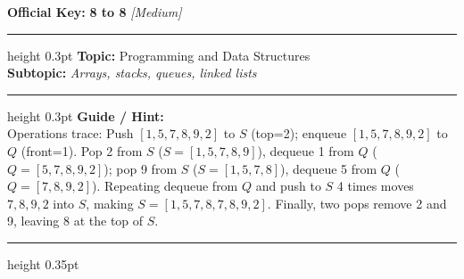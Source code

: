 \documentclass[a4paper,10pt]{article}
\begin{document}
\begin{tcolorbox}
\textbf{Official Key:} \textbf{\large 8 to 8} \hfill \textit{\small [Medium]}
\vspace{2pt}\hrule height 0.3pt\vspace{3pt}
\textbf{Topic:} Programming and Data Structures \\
\textbf{Subtopic:} \textit{Arrays, stacks, queues, linked lists}
\vspace{2pt}\hrule height 0.3pt\vspace{3pt}
\textbf{Guide / Hint:} \\
{\small Operations trace: Push $[1, 5, 7, 8, 9, 2]$ to $S$ (top=2); enqueue $[1, 5, 7, 8, 9, 2]$ to $Q$ (front=1). Pop 2 from $S$ ($S=[1,5,7,8,9]$), dequeue 1 from $Q$ ($Q=[5,7,8,9,2]$); pop 9 from $S$ ($S=[1,5,7,8]$), dequeue 5 from $Q$ ($Q=[7,8,9,2]$). Repeating dequeue from $Q$ and push to $S$ 4 times moves $7, 8, 9, 2$ into $S$, making $S=[1,5,7,8,7,8,9,2]$. Finally, two pops remove 2 and 9, leaving 8 at the top of $S$.}

\end{tcolorbox}
\vspace{6pt}\hrule height 0.35pt\vspace{6pt}
\noindent
\end{document}
